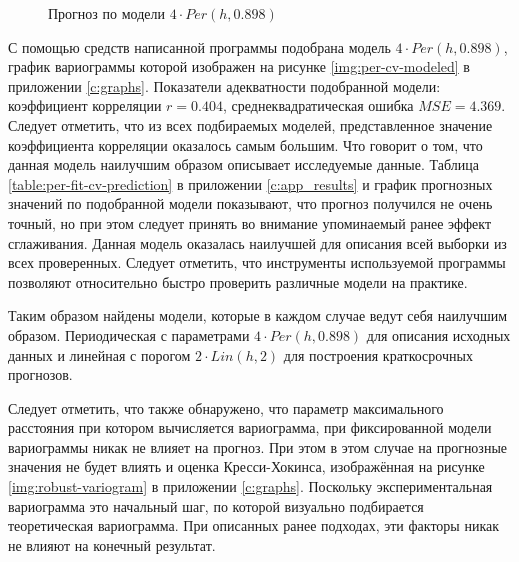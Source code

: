 \begin{figure}[ht]
\caption{Прогноз по модели $ 4 \cdot Per(h, 0.898) $}
\label{img:per-cv-pred}
\end{figure}
С помощью средств написанной программы подобрана модель $ 4 \cdot Per(h, 0.898) $, график вариограммы которой изображен на рисунке \ref{img:per-cv-modeled} в приложении \ref{c:graphs}. Показатели адекватности подобранной модели: коэффициент корреляции $ r = 0.404 $, среднеквадратическая ошибка $ MSE = 4.369 $. Следует отметить, что из всех подбираемых моделей, представленное значение коэффициента корреляции оказалось самым большим. Что говорит о том, что данная модель наилучшим образом описывает исследуемые данные. Таблица \ref{table:per-fit-cv-prediction} в приложении \ref{c:app_results} и график прогнозных значений по подобранной модели показывают, что прогноз получился не очень точный, но при этом следует принять во внимание упоминаемый ранее эффект сглаживания. Данная модель оказалась наилучшей для описания всей выборки из всех проверенных. Следует отметить, что инструменты используемой программы позволяют относительно быстро проверить различные модели на практике.

Таким образом найдены модели, которые в каждом случае ведут себя наилучшим образом. Периодическая с параметрами $ 4 \cdot Per(h, 0.898) $ для описания исходных данных и линейная с порогом $ 2 \cdot Lin(h, 2) $ для построения краткосрочных прогнозов.

Следует отметить, что также обнаружено, что параметр максимального расстояния при котором вычисляется вариограмма, при фиксированной модели вариограммы никак не влияет на прогноз. При этом в этом случае на прогнозные значения не будет влиять и оценка Кресси-Хокинса, изображённая на рисунке \ref{img:robust-variogram} в приложении \ref{c:graphs}. Поскольку экспериментальная вариограмма это начальный шаг, по которой визуально подбирается теоретическая вариограмма. При описанных ранее подходах, эти факторы никак не влияют на конечный результат.

